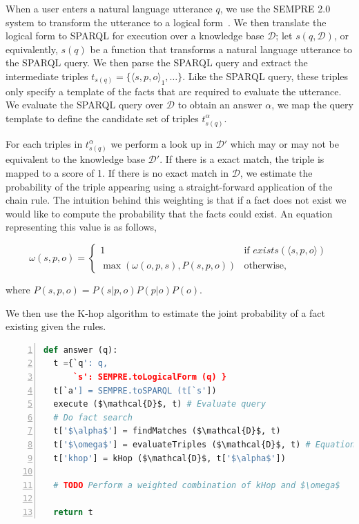 When a user enters a natural language utterance \(q\), we use the SEMPRE 2.0 system to transform the utterance to a logical form~\cite{berant2013freebase,berant2013semantic}.
We then translate the logical form to SPARQL for execution over a knowledge base \(\mathcal{D}\);
let \(s(q,\mathcal{D})\), or equivalently, \(s(q)\) be a function that transforms a natural language utterance to the SPARQL query.
We then parse the SPARQL query and extract the intermediate triples \( t_{s(q)} = \{\langle s,p,o\rangle_1, \ldots \}\). 
Like the SPARQL query, these triples only specify a template of the facts that are required to evaluate the utterance.
We evaluate the SPARQL query over \(\mathcal{D}\) to obtain an answer \( \alpha \), we map the query template to define the candidate set of triples \( t^\alpha_{s(q)} \).

For each triples in \( t^\alpha_{s(q)} \) we perform a look up in \(\mathcal{D'}\) which may or may not be equivalent to the knowledge base \(\mathcal{D'}\).
If there is a exact match, the triple is mapped to a score of 1.
If there is no exact match in \(\mathcal{D}\), we estimate the probability of the triple appearing using a straight-forward application of the chain rule.
The intuition behind this weighting is that if a fact does not exist we would like to compute the probability that the facts could exist.
An equation representing this value is as follows,

\begin{equation}
  \label{eq:probqa-weight}
  \omega(s,p,o) = \begin{cases}
    1 & \mbox{if } exists(\langle s,p,o \rangle) \\ 
    \max( \omega(o,p,s), P(s,p,o)) & \mbox{otherwise,}
  \end{cases}
\end{equation}

where \( P(s,p,o) = P(s|p,o)  P(p|o)  P(o) \).

We then use the K-hop algorithm to estimate the joint probability of a fact existing given the rules.


\begin{lstlisting}[language=Python,basicstyle=\small,showstringspaces=false,mathescape=true,frame=single,numbers=left,label=probqa-algo,caption={Algorithm for obtaining the information}]
def answer (q):
  t ={`q': q,
      `s': SEMPRE.toLogicalForm (q) }
  t[`a'] = SEMPRE.toSPARQL (t[`s'])
  execute ($\mathcal{D}$, t) # Evaluate query
  # Do fact search
  t['$\alpha$'] = findMatches ($\mathcal{D}$, t) 
  t['$\omega$'] = evaluateTriples ($\mathcal{D}$, t) # Equation~\ref{eq:probqa-weight}
  t['khop'] = kHop ($\mathcal{D}$, t['$\alpha$'])

  # TODO Perform a weighted combination of kHop and $\omega$

  return t

\end{lstlisting}



